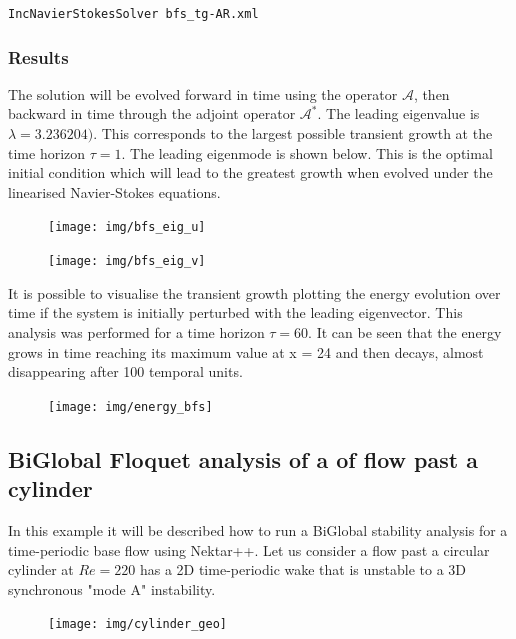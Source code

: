 \texttt{IncNavierStokesSolver bfs\_tg-AR.xml}

\subsubsection{Results}

The solution will be evolved forward in time using the operator $\mathcal{A}$, then backward in time through the adjoint operator $\mathcal{A}^*$. The leading eigenvalue is $\lambda= 3.236204)$. This corresponds to the largest possible transient growth at the time horizon $\tau= 1$. The leading eigenmode is shown below. This is the optimal initial condition which will lead to the greatest growth when evolved under the linearised Navier-Stokes equations.


\begin{figure}[!htbp]
\centering
 {\texttt{[image: img/bfs\_eig\_u]}}
   \caption {}
\end{figure}

\begin{figure}[!htbp]
\centering
 {\texttt{[image: img/bfs\_eig\_v]}}
    \caption {}
\end{figure}

It is possible to visualise the transient growth plotting the energy evolution over time if the system is initially perturbed with the leading eigenvector. This analysis was performed  for a time horizon $\tau= 60$. It can be seen that the energy grows in time reaching its maximum value at x = 24 and then decays, almost disappearing after 100 temporal units.


\begin{figure}[!htbp]
\centering
 {\texttt{[image: img/energy\_bfs]}}
   \caption {}
\end{figure}

\subsection{BiGlobal Floquet analysis of a of flow past a cylinder}

 In this example it will be described how to run a BiGlobal stability analysis for a time-periodic base flow using Nektar++. Let us consider a flow past a circular cylinder at $Re=220$ has a 2D time-periodic wake that is unstable to a 3D synchronous "mode A" instability.

 \begin{figure}[!htbp]
\centering
 {\texttt{[image: img/cylinder\_geo]}}
   \caption {}
\end{figure}


